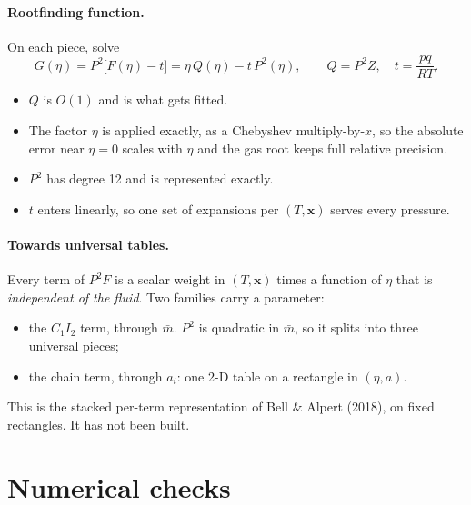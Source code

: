 \documentclass[11pt]{article}
\newcommand{\mbar}{\bar m}
\begin{document}
\paragraph{Rootfinding function.} On each piece, solve
\begin{equation}
G(\eta) = P^2\bigl[F(\eta) - t\bigr] = \eta\,Q(\eta) - t\,P^2(\eta),\qquad Q = P^2 Z,\quad t = \frac{pq}{RT}.
\end{equation}
\begin{itemize}
\item $Q$ is $O(1)$ and is what gets fitted.
\item The factor $\eta$ is applied exactly, as a Chebyshev multiply-by-$x$, so the absolute
error near $\eta=0$ scales with $\eta$ and the gas root keeps full relative precision.
\item $P^2$ has degree 12 and is represented exactly.
\item $t$ enters linearly, so one set of expansions per $(T,\mathbf x)$ serves every pressure.
\end{itemize}

\paragraph{Towards universal tables.} Every term of $P^2F$ is a scalar weight in $(T,\mathbf x)$
times a function of $\eta$ that is \emph{independent of the fluid}. Two families carry a
parameter:
\begin{itemize}
\item the $C_1I_2$ term, through $\mbar$. $P^2$ is quadratic in $\mbar$, so it splits into
three universal pieces;
\item the chain term, through $a_i$: one 2-D table on a rectangle in $(\eta,a)$.
\end{itemize}
This is the stacked per-term representation of Bell \& Alpert (2018), on fixed rectangles.
It has not been built.

\section{Numerical checks}\label{sec:check}
\end{document}
